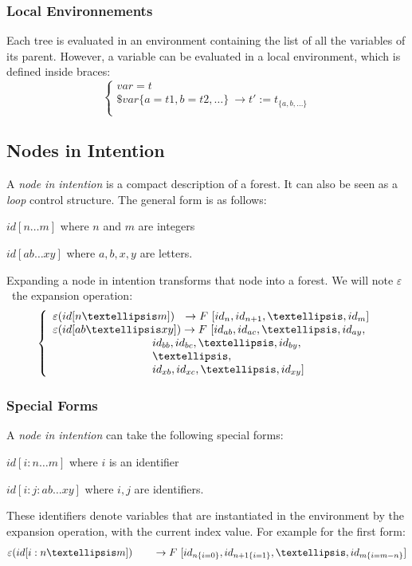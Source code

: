 \documentclass[runningheads]{llncs}
\newcommand{\foret}		{\ensuremath{F}}
\newcommand{\etc}		{\ensuremath{…}}
\newcommand{\nexpand}	{\ensuremath{\varepsilon}}
\newcommand{\ule}		{\hspace*{31.5mm}}
\begin{document}
\subsubsection{Local Environnements}

Each tree is evaluated in an environment containing the list of all the variables of its parent. However, a variable can be evaluated in a local environment, which is defined inside braces:
\[
\left\{
\begin{array}{l}
	var = t \\
	\$var\{a=t1, b=t2,\etc\} \ \to  t' := t_{\{a, b,\etc\}} \\
\end{array}
\right.
\]


\subsection{Nodes in Intention}

A \emph{node in intention} is a compact description of a forest. It can also be seen as a \emph{loop} control structure. The general form is as follows:
\begin{description}
 \setlength\itemsep{0.0em}
\item $id[n…m]$ 	where $n$ and $m$ are integers
\item $id[ab…xy]$ where $a,b,x,y$ are letters.
\end{description}

Expanding a node in intention transforms that node into a forest. We will note \nexpand\ the expansion operation:
\[
\left\{
\begin{array}{l}
	\nexpand(id[n…m])   \ \ \to \foret \ [id_n,id_{n+1},…,id_m] \\
	\nexpand(id[ab…xy]) \to \foret \ [id_{ab},id_{ac},…,id_{ay}, \\
	\ule id_{bb},id_{bc},…,id_{by},\\
	\ule …,\\
	\ule id_{xb},id_{xc},…,id_{xy}]
\end{array}
\right.
\]

\subsubsection{Special Forms}

A \emph{node in intention} can take the following special forms: 
\begin{description}
\item $id[i:n…m]$ 	where $i$ is an identifier
\item $id[i:j:ab…xy]$ where $i,j$ are identifiers.
\end{description}
These identifiers denote variables that are instantiated in the environment by the expansion operation, with the current index value. For example for the first form:
\[
	\nexpand(id[i:n…m])   \qquad \to \foret \ [id_{n\{i=0\}},id_{n+1\{i=1\}},…,id_{m\{i=m-n\}}] \\
\]
\end{document}
